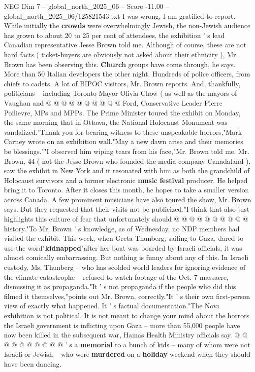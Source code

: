 \begin{textsample}{NEG Dim 7 – global\_north\_2025\_06 – Score -11.00 – global\_north\_2025\_06/125821543.txt}
I was wrong, I am gratified to report.
While initially the \textbf{crowds} were overwhelmingly Jewish, the non-Jewish audience has grown to about 20 to 25 per cent of attendees, the exhibition ' s lead Canadian representative Jesse Brown told me.
Although of course, these are not hard facts ( ticket-buyers are obviously not asked about their ethnicity ), Mr.
Brown has been observing this. \textbf{Church} groups have come through, he says.
More than 50 Italian developers the other night.
Hundreds of police officers, from chiefs to cadets.
A lot of BIPOC visitors, Mr.
Brown reports.
And, thankfully, politicians -- including Toronto Mayor Olivia Chow ( as well as the mayors of Vaughan and @ @ @ @ @ @ @ @ @ @ Ford, Conservative Leader Pierre Poilievre, MPs and MPPs.
The Prime Minister toured the exhibit on Monday, the same morning that in Ottawa, the National Holocaust Monument was vandalized."Thank you for bearing witness to these unspeakable horrors,"Mark Carney wrote on an exhibition wall."May a new dawn arise and their memories be blessings.""I observed him wiping tears from his face,"Mr.
Brown told me.
Mr.
Brown, 44 ( not the Jesse Brown who founded the media company Canadaland ), saw the exhibit in New York and it resonated with him as both the grandchild of Holocaust survivors and a former electronic \textbf{music} \textbf{festival} producer.
He helped bring it to Toronto.
After it closes this month, he hopes to take a smaller version across Canada.
A few prominent musicians have also toured the show, Mr.
Brown says.
But they requested that their visits not be publicized."I think that also just highlights this culture of fear that unfortunately should @ @ @ @ @ @ @ @ @ @ history."To Mr.
Brown ' s knowledge, as of Wednesday, no NDP members had visited the exhibit.
This week, when Greta Thunberg, sailing to Gaza, dared to use the word"\textbf{kidnapped}"after her boat was boarded by Israeli officials, it was almost comically embarrassing.
But nothing is funny about any of this.
In Israeli custody, Ms.
Thunberg -- who has scolded world leaders for ignoring evidence of the climate catastrophe -- refused to watch footage of the Oct. 7 massacre, dismissing it as propaganda."It ' s not propaganda if the people who did this filmed it themselves,"points out Mr.
Brown, correctly."It ' s their own first-person view of exactly what happened.
It ' s factual documentation."The Nova exhibition is not political.
It is not meant to change your mind about the horrors the Israeli government is inflicting upon Gaza -- more than 55,000 people have now been killed in the subsequent war, Hamas Health Ministry officials say. @ @ @ @ @ @ @ @ @ @ ' s a \textbf{memorial} to a bunch of kids -- many of whom were not Israeli or Jewish -- who were \textbf{murdered} on a \textbf{holiday} weekend when they should have been dancing.

\end{textsample}

